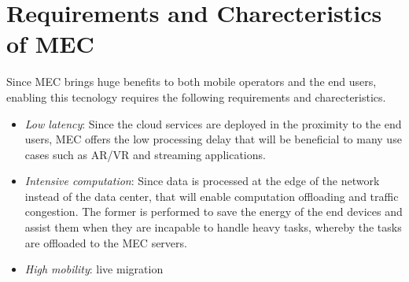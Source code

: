 \section{Requirements and Charecteristics of MEC}  \label{requirements}

Since MEC brings huge benefits to both mobile operators and the end users, enabling this tecnology requires the following requirements and charecteristics.

\begin{itemize}

\item \textit{\textit{Low latency}}: Since the cloud services are deployed in the proximity to the end users, MEC offers the low processing delay that will be beneficial to many use cases such as AR/VR and streaming applications.

\item \textit{\textit{Intensive computation}}: Since data is processed at the edge of the network instead of the data center, that will enable computation offloading and traffic congestion. The former is performed to save the energy of the end devices and assist them when they are incapable to handle heavy tasks, whereby the tasks are offloaded to the MEC servers.

\item \textit{\textit{High mobility}}: live migration

\end{itemize}
